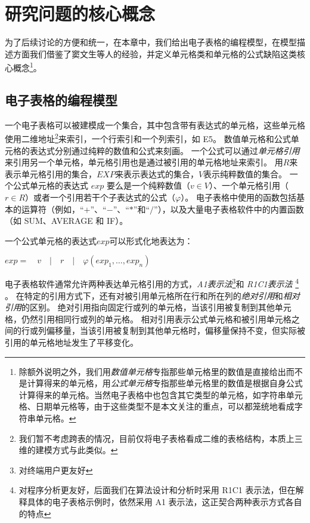 \chapter{研究问题的核心概念}
为了后续讨论的方便和统一，在本章中，我们给出电子表格的编程模型，在模型描述方面我们借鉴了窦文生等人的经验\cite{dou2017cacheck}，并定义单元格类和单元格的公式缺陷这类核心概念\footnote{除额外说明之外，我们用\textit{数值单元格}专指那些单元格里的数值是直接给出而不是计算得来的单元格，用\textit{公式单元格}专指那些单元格里的数值是根据自身公式计算得来的单元格。当然电子表格中也包含其它类型的单元格，如字符串单元格、日期单元格等，由于这些类型不是本文关注的重点，可以都笼统地看成字符串单元格。}。


\section{电子表格的编程模型}
一个电子表格可以被建模成一个集合，其中包含带有表达式的单元格，这些单元格使用二维地址\footnote{我们暂不考虑跨表的情况，目前仅将电子表格看成二维的表格结构，本质上三维的建模方式与此类似。}来索引，一个行索引和一个列索引，如 E5。
数值单元格和公式单元格的表达式分别通过纯粹的数值和公式来刻画。
一个公式可以通过\textit{单元格引用}来引用另一个单元格，单元格引用也是通过被引用的单元格地址来索引。
用$R$来表示单元格引用的集合，$EXP$来表示表达式的集合，$V$表示纯粹数值的集合。
一个公式单元格的表达式 $exp$ 要么是一个纯粹数值（$v \in V$）、一个单元格引用（$r \in R$）或者一个引用若干个子表达式的公式（$\varphi $）。
电子表格中使用的函数包括基本的运算符（例如，“$+$”、“$-$”、“$*$”和“$/$”），以及大量电子表格软件中的内置函数（如 SUM、AVERAGE 和 IF）。

一个公式单元格的表达式$exp$可以形式化地表达为：
\begin{definition}
    $ exp =\quad v\quad |\quad r\quad |\quad \varphi (exp_1,\dots,exp_n) $
\end{definition}




电子表格软件通常允许两种表达单元格引用的方式，\textit{A1表示法}\footnote{对终端用户更友好}和 \textit{R1C1表示法} \footnote{对程序分析更友好，后面我们在算法设计和分析时采用 R1C1 表示法，但在解释具体的电子表格示例时，依然采用 A1 表示法，这正契合两种表示方式各自的特点} \cite{tan2014bug}。
在特定的引用方式下，还有对被引用单元格所在行和所在列的\textit{绝对引用}和\textit{相对引用}的区别。
绝对引用指向固定行或列的单元格，当该引用被复制到其他单元格，仍然引用相同行或列的单元格。
相对引用表示公式单元格和被引用单元格之间的行或列偏移量，当该引用被复制到其他单元格时，偏移量保持不变，但实际被引用的单元格地址发生了平移变化。

